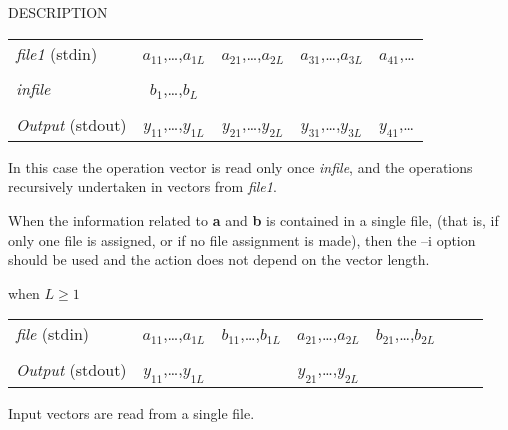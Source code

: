 \begin{qsection}{DESCRIPTION}
\begin{description}
\begin{tabular}{l|c|c|c|l}
{\em file1} (stdin)	& {$a_{11}$,\dots,$a_{1L}$}
			& {$a_{21}$,\dots,$a_{2L}$}
			& {$a_{31}$,\dots,$a_{3L}$}
			& {$a_{41}$,\dots} \\ \cline{2-5}
\multicolumn{5}{c}{}	\\[-10pt]
			\cline{2-2}
{\em infile}		& {$b_{1}$,\dots,$b_{L}$}
			& \multicolumn{3}{c}{} \\ \cline{2-2}
\multicolumn{5}{c}{}	\\[-10pt]
			\cline{2-5}			
{\em Output} (stdout)	& {$y_{11}$,\dots,$y_{1L}$}
			& {$y_{21}$,\dots,$y_{2L}$}
			& {$y_{31}$,\dots,$y_{3L}$}
			& {$y_{41}$,\dots} \\ \cline{2-5}
\end{tabular}
\par
In this case the operation vector is read only once
{\em infile}, and the operations recursively undertaken
in vectors from {\em file1}.
\end{description}
\par
When the information related to {\bf a} and {\bf b} is contained
in a single file,
(that is, if only one file is assigned,
or if no file assignment is made),
then the --i option should be used
and the action does not depend on the vector length.
\begin{description}
\item{when $L\geq 1$}~\\
\begin{tabular}{l|c|c|c|c|l} \cline{2-6}
{\em file} (stdin)	& {$a_{11}$,\dots,$a_{1L}$}
			& {$b_{11}$,\dots,$b_{1L}$}
			& {$a_{21}$,\dots,$a_{2L}$}
			& {$b_{21}$,\dots,$b_{2L}$}
			& ~~~ \\ \cline{2-6}
\multicolumn{6}{c}{}	\\[-10pt]
			\cline{2-2} \cline{4-4} \cline{6-6}
{\em Output} (stdout)	& {$y_{11}$,\dots,$y_{1L}$} &
			& {$y_{21}$,\dots,$y_{2L}$} &
			& ~~~ \\
			\cline{2-2} \cline{4-4} \cline{6-6}
\end{tabular}
\par
Input vectors are read from a single file.
\end{description}
\end{qsection}

\begin{options}
\end{options}

